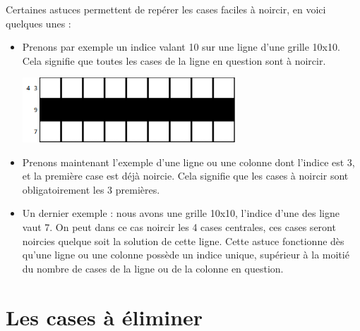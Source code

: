 \documentclass[a4paper, 12pt]{report}
\begin{document}
            Certaines astuces permettent de repérer les cases faciles à noircir, en voici quelques unes :
            \begin{itemize}
                \item Prenons par exemple un indice valant 10 sur une ligne d'une grille 10x10. Cela signifie que toutes les cases de la ligne en question sont à noircir.\\
                \begin{minipage}{\linewidth}
                    \centering
			        \includegraphics[width=8cm]{ligneExemple1.png}
	            \end{minipage}
                \item Prenons maintenant l'exemple d'une ligne ou une colonne dont l'indice est 3, et la première case est déjà noircie. Cela signifie que les cases à noircir sont obligatoirement les 3 premières.
                \item Un dernier exemple : nous avons une grille 10x10, l'indice d'une des ligne vaut 7. On peut dans ce cas noircir les 4 cases centrales, ces cases seront noircies quelque soit la solution de cette ligne. Cette astuce fonctionne dès qu'une ligne ou une colonne possède un indice unique, supérieur à la moitié du nombre de cases de la ligne ou de la colonne en question.
                \end{itemize}


		\section{Les cases à éliminer}
            
\end{document}
